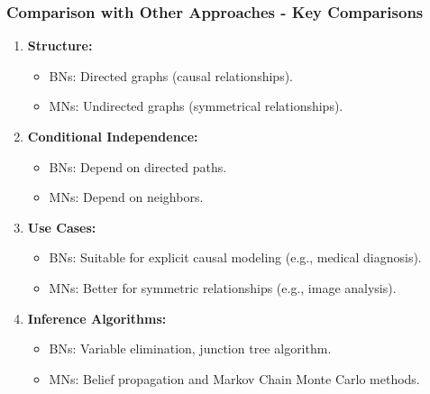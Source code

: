 \documentclass[aspectratio=169]{beamer}
\begin{document}
\begin{frame}[fragile]
    \frametitle{Comparison with Other Approaches - Key Comparisons}

    \begin{enumerate}
        \item \textbf{Structure:}
            \begin{itemize}
                \item BNs: Directed graphs (causal relationships).
                \item MNs: Undirected graphs (symmetrical relationships).
            \end{itemize}
            
        \item \textbf{Conditional Independence:}
            \begin{itemize}
                \item BNs: Depend on directed paths.
                \item MNs: Depend on neighbors.
            \end{itemize}
            
        \item \textbf{Use Cases:}
            \begin{itemize}
                \item BNs: Suitable for explicit causal modeling (e.g., medical diagnosis).
                \item MNs: Better for symmetric relationships (e.g., image analysis).
            \end{itemize}
            
        \item \textbf{Inference Algorithms:}
            \begin{itemize}
                \item BNs: Variable elimination, junction tree algorithm.
                \item MNs: Belief propagation and Markov Chain Monte Carlo methods.
            \end{itemize}
    \end{enumerate}
\end{frame}
\end{document}
